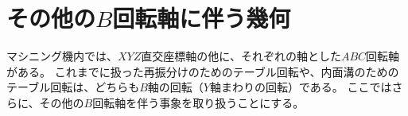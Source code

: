 \chapter[その他の\texorpdfstring{$B$}{B}回転軸に伴う幾何]
        {その他の$B$回転軸に伴う幾何}
マシニング機内では、$XYZ$直交座標軸の他に、それぞれの軸とした$ABC$回転軸がある。
これまでに扱った再振分けのためのテーブル回転や、内面溝のためのテーブル回転は、どちらも$B$軸の回転（$Y$軸まわりの回転）である。
ここではさらに、その他の$B$回転軸を伴う事象を取り扱うことにする。



